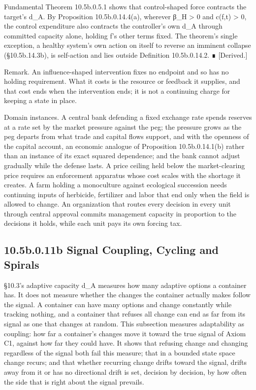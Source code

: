 \documentclass[
]{article}
\begin{document}
Fundamental Theorem 10.5b.0.5.1 shows that control-shaped force
contracts the target's d\_A. By Proposition 10.5b.0.14.4(a), wherever
β\_H \textgreater{} 0 and c(f,t) \textgreater{} 0, the control
expenditure also contracts the controller's own d\_A through committed
capacity alone, holding f's other terms fixed. The theorem's single
exception, a healthy system's own action on itself to reverse an
imminent collapse (§10.5b.14.3b), is self-action and lies outside
Definition 10.5b.0.14.2. ∎ {[}Derived.{]}

Remark. An influence-shaped intervention fixes no endpoint and so has no
holding requirement. What it costs is the resource or feedback it
supplies, and that cost ends when the intervention ends; it is not a
continuing charge for keeping a state in place.

Domain instances. A central bank defending a fixed exchange rate spends
reserves at a rate set by the market pressure against the peg; the
pressure grows as the peg departs from what trade and capital flows
support, and with the openness of the capital account, an economic
analogue of Proposition 10.5b.0.14.1(b) rather than an instance of its
exact squared dependence; and the bank cannot adjust gradually while the
defense lasts. A price ceiling held below the market-clearing price
requires an enforcement apparatus whose cost scales with the shortage it
creates. A farm holding a monoculture against ecological succession
needs continuing inputs of herbicide, fertilizer and labor that end only
when the field is allowed to change. An organization that routes every
decision in every unit through central approval commits management
capacity in proportion to the decisions it holds, while each unit pays
its own forcing tax.

\hypertarget{b.0.11b-signal-coupling-cycling-and-spirals}{%
\subsection{10.5b.0.11b Signal Coupling, Cycling and
Spirals}\label{b.0.11b-signal-coupling-cycling-and-spirals}}

§10.3's adaptive capacity d\_A measures how many adaptive options a
container has. It does not measure whether the changes the container
actually makes follow the signal. A container can have many options and
change constantly while tracking nothing, and a container that refuses
all change can end as far from its signal as one that changes at random.
This subsection measures adaptability as coupling: how far a container's
changes move it toward the true signal of Axiom C1, against how far they
could have. It shows that refusing change and changing regardless of the
signal both fail this measure; that in a bounded state space change
recurs; and that whether recurring change drifts toward the signal,
drifts away from it or has no directional drift is set, decision by
decision, by how often the side that is right about the signal prevails.
\end{document}
